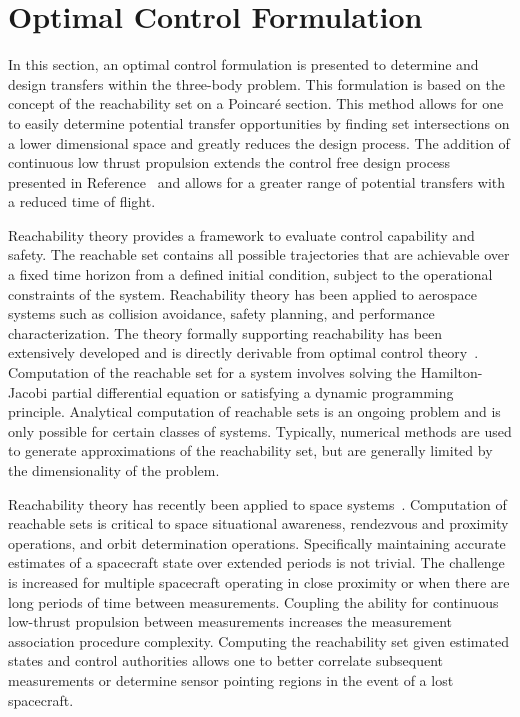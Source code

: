 \documentclass[letterpaper, preprint, paper,11pt]{AAS}	%
\begin{document}
\section{Optimal Control Formulation}\label{sec:optimal_control}
In this section, an optimal control formulation is presented to determine and design transfers within the three-body problem.
This formulation is based on the concept of the reachability set on a Poincar\'e section.
This method allows for one to easily determine potential transfer opportunities by finding set intersections on a lower dimensional space and greatly reduces the design process.
The addition of continuous low thrust propulsion extends the control free design process presented in Reference~ and allows for a greater range of potential transfers with a reduced time of flight.

Reachability theory provides a framework to evaluate control capability and safety.  
The reachable set contains all possible trajectories that are achievable over a fixed time horizon from a defined initial condition, subject to the operational constraints of the system.
Reachability theory has been applied to aerospace systems such as collision avoidance, safety planning, and performance characterization.
The theory formally supporting reachability has been extensively developed and is directly derivable from optimal control theory~\cite{varaiya2000,lygeros2002,lygeros2004}.
Computation of the reachable set for a system involves solving the Hamilton-Jacobi partial differential equation or satisfying a dynamic programming principle.
Analytical computation of reachable sets is an ongoing problem and is only possible for certain classes of systems.
Typically, numerical methods are used to generate approximations of the reachability set, but are generally limited by the dimensionality of the problem.
 
Reachability theory has recently been applied to space systems~\cite{holzinger2009,komendera2012a}.
Computation of reachable sets is critical to space situational awareness, rendezvous and proximity operations, and orbit determination operations.
Specifically maintaining accurate estimates of a spacecraft state over extended periods is not trivial.
The challenge is increased for multiple spacecraft operating in close proximity or when there are long periods of time between measurements.
Coupling the ability for continuous low-thrust propulsion between measurements increases the measurement association procedure complexity.
Computing the reachability set given estimated states and control authorities allows one to better correlate subsequent measurements or determine sensor pointing regions in the event of a lost spacecraft. 
\end{document}

